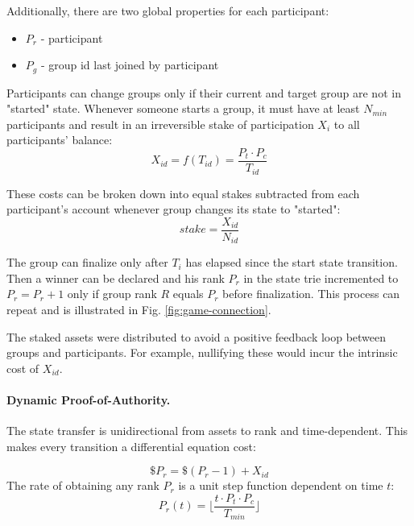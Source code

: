 \documentclass{article}
\begin{document}
\begin{CJK}{UTF8}{gbsn}
    Additionally, there are two global properties for each participant:

    \begin{itemize}[nosep]
        \item  $P_r$ - participant
        \item $P_g$ - group id last joined by participant
    \end{itemize}

    Participants can change groups only if their current and target group are not in "started" state. Whenever someone starts a group, it must have at least $N_{min}$ participants and result in an irreversible stake of participation $X_i$ to all participants' balance:
    \begin{equation}
        \label{eq:group-fee}
        X_{id} = f(T_{id}) = \dfrac{P_t \cdot  P_c }{T_{id}}
    \end{equation}

    These costs can be broken down into equal stakes subtracted from each participant's account whenever group changes its state to "started":
    \begin{equation}
        \label{eq:join-fee}
        stake = \dfrac{X_{id}}{ N_{id}}
    \end{equation}
    
    The group can finalize only after $T_{i}$ has elapsed since the start state transition. Then a winner can be declared and his rank $P_r$ in the state trie incremented to $P_r=P_r+1$ only if group rank $R$ equals $P_r$ before finalization. This process can repeat and is illustrated in Fig. \ref*{fig:game-connection}.

    The staked assets were distributed to avoid a positive feedback loop between groups and participants. For example, nullifying these would incur the intrinsic cost of $X_{id}$.

    \paragraph{Dynamic Proof-of-Authority.} The state transfer is unidirectional from assets to rank and time-dependent. This makes every transition a differential equation cost:

    \begin{equation}
        \label{eq:time-weighted-proof-of-authority}
        \$P_r = \$(P_r-1) + X_{id}
    \end{equation}
    The rate of obtaining any rank $P_r$ is a unit step function dependent on time $t$:
    \begin{equation}
        \label{eq:time-weighted-proof-of-authority-1}
        P_r(t) = \lfloor \dfrac{t \cdot P_t \cdot P_c}{T_{min}} \rfloor
    \end{equation}


\end{CJK}
\end{document}
